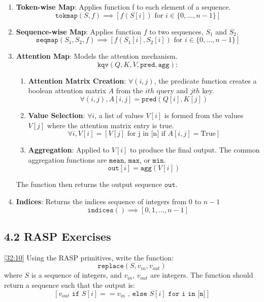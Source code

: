 \documentclass[12pt, twoside]{article}
\begin{document}
\begin{enumerate}
\item \textbf{Token-wise Map}: Applies function f to each element of a sequence.
$$ \texttt{tokmap}(S,f) \implies [f(S[i]) \text{ for } i \in \{0, \dots, n-1\}] $$

\item \textbf{Sequence-wise Map}: Applies function $f$ to two sequences, $S_1$ and $S_2$.
$$ \texttt{seqmap}(S_1, S_2, f) \implies [f(S_1[i], S_2[i]) \text{ for } i \in \{0, \dots, n-1\}] $$

\item \textbf{Attention Map}: Models the  attention mechanism.
$$
\texttt{kqv}(Q, K, V, \texttt{pred}, \texttt{agg}):
$$
\begin{enumerate}
    \item \textbf{Attention Matrix Creation}: $\forall (i,j)$, the predicate function creates a boolean attention matrix $A$ from the $ith$ query and $jth$ key.
    $$\forall(i,j), A[i,j] = \texttt{pred}(Q[i], K[j]) $$
    \item \textbf{Value Selection}: $\forall i$, a list of values $V[i]$ is formed from the values $V[j]$ where the attention matrix entry is true.
    $$\forall i, V[i] = [V[j] \text{ for j in [n] if }A[i,j] = \text{True}] $$
    \item \textbf{Aggregation}: Applied to $V[i]$ to produce the final output. The common aggregation functions are $\texttt{mean}$, $\texttt{max}$, or $\texttt{min}$.
    $$ \texttt{out}[i] = \texttt{agg}(V[i]) $$
\end{enumerate}
The function then returns the output sequence $\texttt{out}$.

\item \textbf{Indices}: Returns the indices sequence of integers from 0 to $n-1$
$$ \texttt{indices}() \implies [0, 1, \dots, n-1] $$

\end{enumerate}

\subsection*{4.2 RASP Exercises}

\begin{exercise} \label{ex:3.1}\href{https://youtu.be/2MRAX8EdBA8?si=XAs4mEP1f94aiN26&t=1928}{[32:10]} Using the RASP primitives, write the function:
$$ \texttt{replace}(S, v_{in}, v_{out}) $$
where $S$ is a sequence of integers, and $v_{in}$, $v_{out}$ are integers. The function should return a sequence such that the output is:
$$ [v_{out} \texttt{ if } S[i] == v_{in} \texttt{ , else } S[i] \texttt{ for i in [n]}] $$

\end{exercise}
\end{document}
